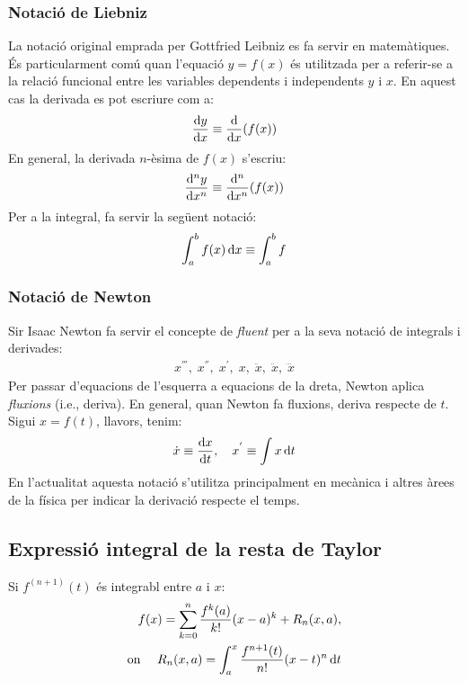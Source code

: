 \subsubsection*{Notació de Liebniz}
La notació original emprada per Gottfried Leibniz es fa servir en matemàtiques. És particularment comú quan l'equació $y = f(x)$ és utilitzada per a referir-se a la relació funcional entre les variables dependents i independents $y$ i $x$. En aquest cas la derivada es pot escriure com a:
\begin{align}
    \frac{\mathrm{d} y}{\mathrm{d} x} \equiv \frac{\mathrm{d}}{\mathrm{d} x}(f(x))
\end{align}
En general, la derivada $n$-èsima de $f(x)$ s'escriu:
\begin{align}
    \frac{\mathrm{d}^{n}y}{\mathrm{d} x^{n}} \equiv \frac{\mathrm{d}^{n}}{\mathrm{d} x^{n}}(f(x))
\end{align}
Per a la integral, fa servir la següent notació:
\begin{align}
    \int_{a}^{b} f(x) \mathop{}\!\mathrm{d} x \equiv \int_{a}^{b} f
\end{align}

\subsubsection*{Notació de Newton}
Sir Isaac Newton fa servir el concepte de \textit{fluent} per a la seva notació de integrals i derivades:
\begin{align*}
    x^{'''} , \; x^{''} , \; x^{'} , \; x , \; \ddot{x} , \; \ddot{x} , \; \dddot{x}
\end{align*}
Per passar d'equacions de l'esquerra a equacions de la dreta, Newton aplica \textit{fluxions} (i.e., deriva). En general, quan Newton fa fluxions, deriva respecte de $t$. Sigui $x = f(t)$, llavors, tenim:
\begin{align}
    \dot{x} \equiv \frac{\mathrm{d} x} {\mathrm{d} t} , \quad x^{'} \equiv \int x \mathop{}\!\mathrm{d} t
\end{align}
En l'actualitat aquesta notació s'utilitza principalment en mecànica i altres àrees de la física per indicar la derivació respecte el temps. 

\subsection{Expressió integral de la resta de Taylor}
Si $f^{(n+1)} (t)$ és integrabl entre $a$ i $x$:
\begin{align}
    f(x) = \sum\limits_{k=0}^{n} \frac{f^{k}(a)}{k!} (x-a)^{k} + R_{n} (x,a), \\
    \text{on } \quad R_{n} (x,a) = \int_{a}^{x} \frac{f^{n+1}(t)}{n!} (x-t)^{n} \mathop{}\!\mathrm{d} t
\end{align}


